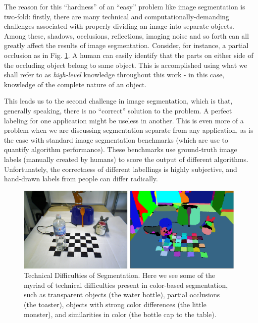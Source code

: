 The reason for this ``hardness'' of an ``easy'' problem like image segmentation is two-fold: firstly, there are many technical and computationally-demanding challenges associated with properly dividing an image into separate objects. Among these, shadows, occlusions, reflections, imaging noise and so forth can all greatly affect the results of image segmentation. Consider, for instance, a partial occlusion as in Fig. \ref{fig:SegmentationProblems}. A human can easily identify that the parts on either side of the occluding object belong to same object. This is accomplished using what we shall refer to as \emph{high-level} knowledge throughout this work - in this case, knowledge of the complete nature of an object.

This leads us to the second challenge in image segmentation, which is that, generally speaking, there is no ``correct'' solution to the problem. A perfect labeling for one application might be useless in another. This is even more of a problem when we are discussing segmentation separate from any application, as is the case with standard image segmentation benchmarks (which are use to quantify algorithm performance). These benchmarks use ground-truth image labels (manually created by humans) to score the output of different algorithms. Unfortunately, the correctness of different labellings is highly subjective, and hand-drawn labels from  people can differ radically.

\begin{figure}
\label{fig:SegmentationProblems}
\centering
\includegraphics[width=\linewidth]{figures/Introduction/Segmentation_Problems.pdf}
\caption[Technical Difficulties of Segmentation]{Technical Difficulties of Segmentation. Here we see some of the myriad of technical difficulties present in color-based segmentation, such as transparent objects (the water bottle), partial occlusions (the toaster), objects with strong color differences (the little monster), and similarities in color (the bottle cap to the table).}
\end{figure}



